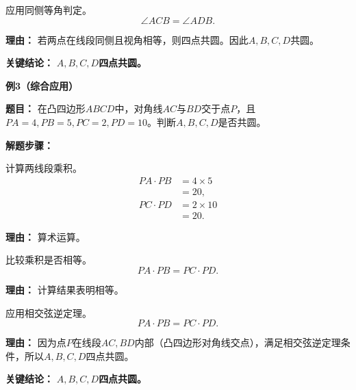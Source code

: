 \begin{examplebox}
\begin{description}[style=nextline, leftmargin=2.8em, labelsep=0.5em, itemsep=0.45em]
		\item[\textbf{第三步（应用判定）：}] 应用同侧等角判定。
			\[
				\angle ACB = \angle ADB.
			\]
			\par\textbf{理由：} 若两点在线段同侧且视角相等，则四点共圆。因此$A,B,C,D$共圆。
	\end{description}

	\textbf{\textcolor{CExample}{关键结论：}}
	\textbf{$A,B,C,D$四点共圆。}

	\medskip
	\textbf{\textcolor{CExample}{例3（综合应用）}}

	\textbf{\textcolor{CExample}{题目：}}
	在凸四边形$ABCD$中，对角线$AC$与$BD$交于点$P$，且$PA=4, PB=5, PC=2, PD=10$。判断$A,B,C,D$是否共圆。

	\textbf{\textcolor{CExample}{解题步骤：}}
	\begin{description}[style=nextline, leftmargin=2.8em, labelsep=0.5em, itemsep=0.45em]
		\item[\textbf{第一步（计算乘积）：}] 计算两线段乘积。
			\[
				\begin{aligned}
					PA\cdot PB &= 4 \times 5 \\
					&= 20, \\
					PC\cdot PD &= 2 \times 10 \\
					&= 20.
			\end{aligned}
			\]
			\par\textbf{理由：} 算术运算。

		\item[\textbf{第二步（比较乘积）：}] 比较乘积是否相等。
			\[
				PA\cdot PB = PC\cdot PD.
			\]
			\par\textbf{理由：} 计算结果表明相等。

		\item[\textbf{第三步（应用判定）：}] 应用相交弦逆定理。
			\[
				PA\cdot PB = PC\cdot PD.
			\]
			\par\textbf{理由：} 因为点$P$在线段$AC,BD$内部（凸四边形对角线交点），满足相交弦逆定理条件，所以$A,B,C,D$四点共圆。
	\end{description}

	\textbf{\textcolor{CExample}{关键结论：}}
	\textbf{$A,B,C,D$四点共圆。}
\end{examplebox}
